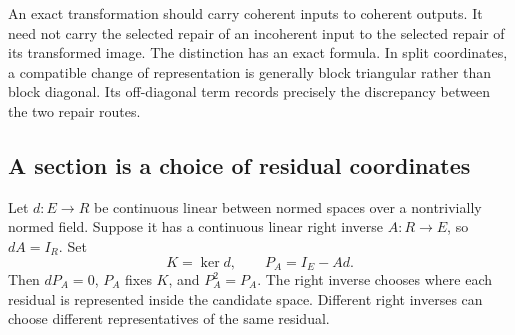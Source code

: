 \label{sec:repair-transport}
An exact transformation should carry coherent inputs to coherent outputs. It need not carry the selected repair of an incoherent input to the selected repair of its transformed image. The distinction has an exact formula. In split coordinates, a compatible change of representation is generally block triangular rather than block diagonal. Its off-diagonal term records precisely the discrepancy between the two repair routes.

\subsection{A section is a choice of residual coordinates}
Let \(d:E\to R\) be continuous linear between normed spaces over a nontrivially normed field. Suppose it has a continuous linear right inverse \(A:R\to E\), so \(dA=I_R\). Set
\[
 K=\ker d,\qquad P_A=I_E-Ad.
\]
Then \(dP_A=0\), \(P_A\) fixes \(K\), and \(P_A^2=P_A\). The right inverse chooses where each residual is represented inside the candidate space. Different right inverses can choose different representatives of the same residual.

